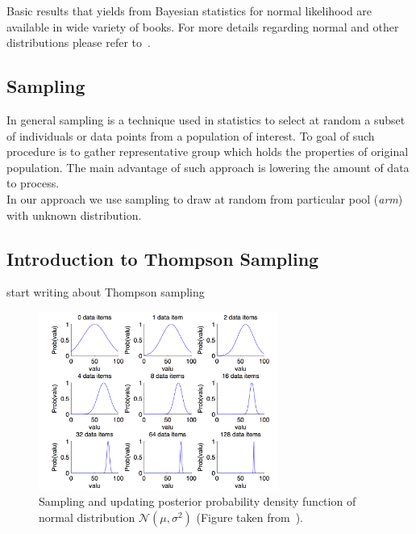 \documentclass[12pt, a4paper, pdflatex]{report}
\begin{document}
Basic results that yields from Bayesian statistics for normal likelihood are available in wide variety of books. For more details regarding normal and other distributions please refer to~\cite{lynch2007introduction}\cite{gelman2003bayesian}.\\

\subsection{Sampling}
In general sampling is a technique used in statistics to select at random a subset of individuals or data points from a population of interest. To goal of such procedure is to gather representative group which holds the properties of original population. The main advantage of such approach is lowering the amount of data to process.\\
In our approach we use sampling to draw at random from particular pool (\emph{arm}) with unknown distribution.

\subsection{Introduction to Thompson Sampling}
start writing about Thompson sampling

\begin{figure}[htbp]
\centering
\includegraphics[width=0.7\textwidth]{graphics/sampling.png}
\begin{tiny}
\caption{Sampling and updating posterior probability density function of normal distribution $\mathcal{N}\left( \mu , \sigma^2 \right)$ (Figure taken from~\cite{Jacobs2008normalnormal}).\label{fig:sampling}}
\end{tiny}
\vspace{1cm}
\end{figure}
\end{document}

